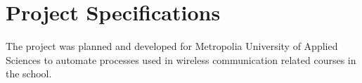 
\chapter{Project Specifications} \label{ch:project_spec}
The project was planned and developed for Metropolia University of Applied Sciences to automate processes used in wireless communication related courses in the school. 

\clearpage %

